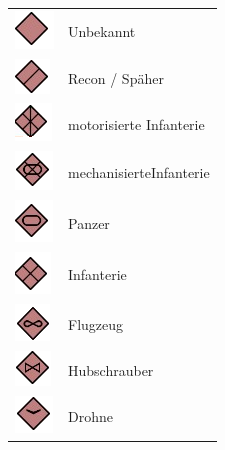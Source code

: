 \begin{longtable}{p{3cm} p{15cm}}
	\includegraphics[scale=1]{./Grafiken/KarteUndMarkierungen/Unbekannt.png}		& 		Unbekannt \\
	\includegraphics[scale=1]{./Grafiken/KarteUndMarkierungen/Recon.png}		 	& 		Recon / Späher \\
	\includegraphics[scale=1]{./Grafiken/KarteUndMarkierungen/motorisierteInfanterie.png}		 & 		motorisierte Infanterie \\
	\includegraphics[scale=1]{./Grafiken/KarteUndMarkierungen/mechanisierteInfanterie.png}		 & 		mechanisierteInfanterie\\
	\includegraphics[scale=1]{./Grafiken/KarteUndMarkierungen/Panzer.png}		& 		Panzer \\
	\includegraphics[scale=1]{./Grafiken/KarteUndMarkierungen/Infanterie.png}		& 		Infanterie \\
	\includegraphics[scale=1]{./Grafiken/KarteUndMarkierungen/Flugzeug.png}		& 		Flugzeug \\
	\includegraphics[scale=1]{./Grafiken/KarteUndMarkierungen/Hubschrauber.png}	&	 	Hubschrauber \\
	\includegraphics[scale=1]{./Grafiken/KarteUndMarkierungen/Drohne.png}		& 		Drohne \\
\end{longtable}